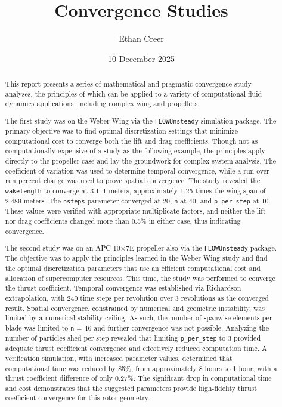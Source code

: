 \documentclass{report}
\title{Convergence Studies}
\author{Ethan Creer}
\date{10 December 2025}
\begin{document}
\maketitle

\begin{abstract}
    This report presents a series of mathematical and pragmatic convergence study analyses, the principles of which can be applied to a variety of computational fluid dynamics applications, including complex wing and propellers.
    \bigskip

    The first study was on the Weber Wing via the \texttt{FLOWUnsteady} simulation package. The primary objective was to find optimal discretization settings that minimize computational cost to converge both the lift and drag coefficients. Though not as computationally expensive of a study as the following example, the principles apply directly to the propeller case and lay the groundwork for complex system analysis. The coefficient of variation was used to determine temporal convergence, while a run over run percent change was used to prove spatial convergence.
    The study revealed the \texttt{wakelength} to converge at 3.111 meters, approximately 1.25 times the wing span of 2.489 meters. The \texttt{nsteps} parameter converged at 20, \texttt{n} at 40, and \texttt{p\_per\_step} at 10. These values were verified with appropriate multiplicate factors, and neither the lift nor drag coefficients changed more than 0.5\% in either case, thus indicating convergence. 

    \bigskip

    The second study was on an APC 10$\times$7E propeller also via the \texttt{FLOWUnsteady} package. The objective was to apply the principles learned in the Weber Wing study and find the optimal discretization parameters that use an efficient computational cost and allocation of supercomputer resources. This time, the study was performed to converge the thrust coefficient. Temporal convergence was established via Richardson extrapolation, with 240 time steps per revolution over 3 revolutions as the converged result. Spatial convergence, constrained by numerical and geometric instability, was limited by a numerical stability ceiling. As such, the number of spanwise elements per blade was limited to \texttt{n} = 46 and further convergence was not possible. Analyzing the number of particles shed per step revealed that limiting \texttt{p\_per\_step} to 3 provided adequate thrust coefficient convergence and effectively reduced computation time. A verification simulation, with increased parameter values, determined that computational time was reduced by 85\%, from approximately 8 hours to 1 hour, with a thrust coefficient difference of only 0.27\%. The significant drop in computational time and cost demonstrates that the suggested parameters provide high-fidelity thrust coefficient convergence for this rotor geometry.
\end{abstract}
\end{document}

